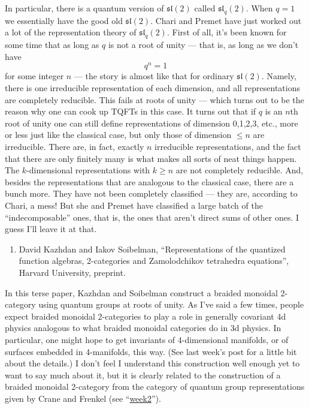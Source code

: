 \documentclass{article}
\def\tightlist{}
\begin{document}
In particular, there is a quantum version of \(\mathfrak{sl}(2)\) called
\(\mathfrak{sl}_q(2)\). When \(q = 1\) we essentially have the good old
\(\mathfrak{sl}(2)\). Chari and Premet have just worked out a lot of the
representation theory of \(\mathfrak{sl}_q(2)\). First of all, it's been
known for some time that as long as \(q\) is not a root of unity ---
that is, as long as we don't have \[q^n = 1\] for some integer \(n\) ---
the story is almost like that for ordinary \(\mathfrak{sl}(2)\). Namely,
there is one irreducible representation of each dimension, and all
representations are completely reducible. This fails at roots of unity
--- which turns out to be the reason why one can cook up TQFTs in this
case. It turns out that if \(q\) is an \(n\)th root of unity one can
still define representations of dimension 0,1,2,3, etc., more or less
just like the classical case, but only those of dimension
\(\leqslant n\) are irreducible. There are, in fact, exactly \(n\)
irreducible representations, and the fact that there are only finitely
many is what makes all sorts of neat things happen. The
\(k\)-dimensional representations with \(k \geqslant n\) are not
completely reducible. And, besides the representations that are
analogous to the classical case, there are a bunch more. They have not
been completely classified --- they are, according to Chari, a mess! But
she and Premet have classified a large batch of the ``indecomposable''
ones, that is, the ones that aren't direct sums of other ones. I guess
I'll leave it at that.

\begin{enumerate}
\def\labelenumi{\arabic{enumi})}
\setcounter{enumi}{1}
\tightlist
\item
  David Kazhdan and Iakov Soibelman, ``Representations of the quantized
  function algebras, 2-categories and Zamolodchikov tetrahedra
  equations'', Harvard University, preprint.
\end{enumerate}

In this terse paper, Kazhdan and Soibelman construct a braided monoidal
2-category using quantum groups at roots of unity. As I've said a few
times, people expect braided monoidal 2-categories to play a role in
generally covariant 4d physics analogous to what braided monoidal
categories do in 3d physics. In particular, one might hope to get
invariants of 4-dimensional manifolds, or of surfaces embedded in
4-manifolds, this way. (See last week's post for a little bit about the
details.) I don't feel I understand this construction well enough yet to
want to say much about it, but it is clearly related to the construction
of a braided monoidal 2-category from the category of quantum group
representations given by Crane and Frenkel (see
``\href{week2.html}{week2}'').
\end{document}
